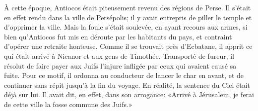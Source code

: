 À cette époque, Antiocos était piteusement revenu des régions de Perse.
Il s’était en effet rendu dans la ville de Persépolis;
	il y avait entrepris de piller le temple et d’opprimer la ville.
Mais la foule s’était soulevée, en ayant recours aux armes,
	si bien qu’Antiocos fut mis en déroute par les habitants du pays,
	et contraint d’opérer une retraite honteuse.
Comme il se trouvait près d’Ecbatane,
	il apprit ce qui était arrivé à Nicanor et aux gens de Timothée.
Transporté de fureur, il résolut de faire payer aux Juifs
		l’injure infligée par ceux qui avaient causé sa fuite.
Pour ce motif, il ordonna au conducteur de lancer le char en avant,
	et de continuer sans répit jusqu’à la fin du voyage.
En réalité, la sentence du Ciel était déjà sur lui.
Il avait dit, en effet, dans son arrogance:
	«Arrivé à Jérusalem, je ferai de cette ville la fosse commune des Juifs.»
